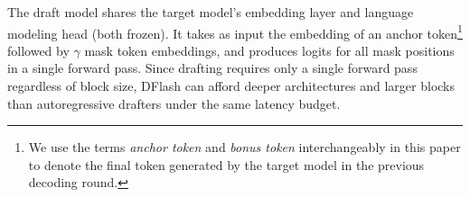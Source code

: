 The draft model shares the target model's embedding layer and language modeling head (both frozen).
It takes as input the embedding of an anchor token\footnote{We use the terms \textit{anchor token} and \textit{bonus token} interchangeably in this paper to denote the final token generated by the target model in the previous decoding round.} followed by $\gamma$ mask token embeddings, and produces logits for all mask positions in a single forward pass.
Since drafting requires only a single forward pass regardless of block size, DFlash can afford deeper architectures and larger blocks than autoregressive drafters under the same latency budget.